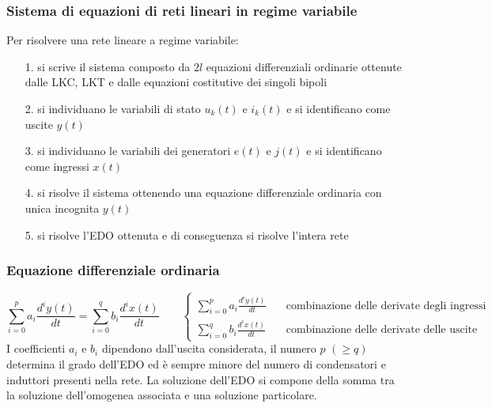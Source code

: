 \documentclass[a4paper]{article}
\begin{document}
\subsubsection*{Sistema di equazioni di reti lineari in regime variabile}
Per risolvere una rete lineare a regime variabile:
\begin{itemize}
	\item[1.] si scrive il sistema composto da \(2l\) equazioni differenziali ordinarie ottenute dalle LKC, LKT e dalle equazioni
	costitutive dei singoli bipoli
	\item[2.] si individuano le variabili di stato \(u_k(t)\) e \(i_k(t)\) e si identificano come uscite \(y(t)\)
	\item[3.] si individuano le variabili dei generatori \(e(t)\) e \(j(t)\) e si identificano come ingressi \(x(t)\)
	\item[4.] si risolve il sistema ottenendo una equazione differenziale ordinaria con unica incognita \(y(t)\)
	\item[5.] si risolve l'EDO ottenuta e di conseguenza si risolve l'intera rete
\end{itemize}

\subsubsection*{Equazione differenziale ordinaria}
\[\sum_{i=0}^{p} a_i \frac{d^i y(t)}{dt} = \sum_{i=0}^{q} b_i \frac{d^i x(t)}{dt} \qquad \begin{cases}
	\sum_{i=0}^{p} a_i \frac{d^i y(t)}{dt} \quad &\text{combinazione delle derivate degli ingressi} \\
	\sum_{i=0}^{q} b_i \frac{d^i x(t)}{dt} \quad &\text{combinazione delle derivate delle uscite}
\end{cases}\]
I coefficienti \(a_i\) e \(b_i\) dipendono dall'uscita considerata, il numero \(p\) \((\geq q)\) determina il grado dell'EDO ed è
sempre minore del numero di condensatori e induttori presenti nella rete. La soluzione dell'EDO si compone della somma tra la
soluzione dell'omogenea associata e una soluzione particolare.
\end{document}
